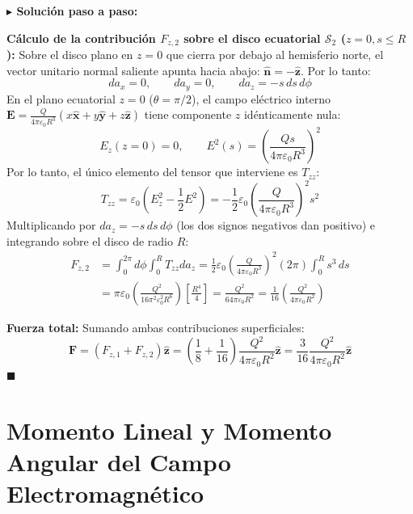 \documentclass[11pt,a4paper]{book}
\newenvironment{solucion}{%
    \par\medskip\noindent\textbf{\color{blue!65!black}\Large $\blacktriangleright$ Solución paso a paso:}\par\medskip
}{%
    \hfill$\blacksquare$\par\bigskip
}
\newcommand{\xhat}{\hat{\bm{x}}}
\newcommand{\yhat}{\hat{\bm{y}}}
\newcommand{\zhat}{\hat{\bm{z}}}
\newcommand{\nhat}{\hat{\bm{n}}}
\newcommand{\Evec}{\bm{E}}
\begin{document}
\begin{solucion}
\textbf{Cálculo de la contribución $F_{z,2}$ sobre el disco ecuatorial $\mathcal{S}_2$ ($z = 0, s \le R$):}
Sobre el disco plano en $z = 0$ que cierra por debajo al hemisferio norte, el vector unitario normal saliente apunta hacia abajo: $\nhat = -\zhat$. Por lo tanto:
\begin{equation}
    da_x = 0, \qquad da_y = 0, \qquad da_z = -s\,ds\,d\phi
\end{equation}
En el plano ecuatorial $z = 0$ ($\theta = \pi/2$), el campo eléctrico interno $\Evec = \frac{Q}{4\pi\varepsilon_0 R^3}(x\xhat + y\yhat + z\zhat)$ tiene componente $z$ idénticamente nula:
\begin{equation}
    E_z(z=0) = 0, \qquad E^2(s) = \left(\frac{Q s}{4\pi\varepsilon_0 R^3}\right)^2
\end{equation}
Por lo tanto, el único elemento del tensor que interviene es $T_{zz}$:
\begin{equation}
    T_{zz} = \varepsilon_0 \left( E_z^2 - \frac{1}{2}E^2 \right) = -\frac{1}{2}\varepsilon_0 \left(\frac{Q}{4\pi\varepsilon_0 R^3}\right)^2 s^2
\end{equation}
Multiplicando por $da_z = -s\,ds\,d\phi$ (los dos signos negativos dan positivo) e integrando sobre el disco de radio $R$:
\begin{align}
    F_{z,2} &= \int_{0}^{2\pi} d\phi \int_{0}^{R} T_{zz} da_z = \frac{1}{2}\varepsilon_0 \left(\frac{Q}{4\pi\varepsilon_0 R^3}\right)^2 (2\pi) \int_{0}^{R} s^3\,ds \nonumber \\
    &= \pi\varepsilon_0 \left(\frac{Q^2}{16\pi^2\varepsilon_0^2 R^6}\right) \left[\frac{R^4}{4}\right] = \frac{Q^2}{64\pi\varepsilon_0 R^2} = \frac{1}{16}\left(\frac{Q^2}{4\pi\varepsilon_0 R^2}\right)
\end{align}

\textbf{Fuerza total:}
Sumando ambas contribuciones superficiales:
\begin{equation}
    \bm{F} = (F_{z,1} + F_{z,2})\zhat = \left(\frac{1}{8} + \frac{1}{16}\right)\frac{Q^2}{4\pi\varepsilon_0 R^2}\zhat = \frac{3}{16} \frac{Q^2}{4\pi\varepsilon_0 R^2} \zhat
\end{equation}
\end{solucion}

\section{Momento Lineal y Momento Angular del Campo Electromagnético}
\end{document}
